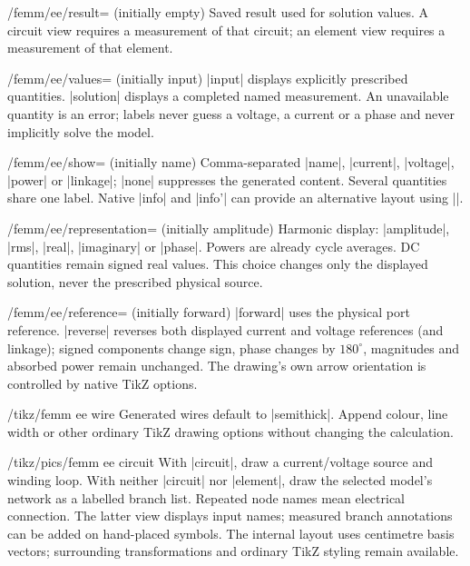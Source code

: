 \begin{key}{/femm/ee/result= (initially empty)}
Saved result used for solution values. A circuit view requires a measurement of
that circuit; an element view requires a measurement of that element.
\end{key}
\begin{key}{/femm/ee/values= (initially input)}
|input| displays explicitly prescribed quantities. |solution| displays a completed
named measurement. An unavailable quantity is an error; labels never guess a
voltage, a current or a phase and never implicitly solve the model.
\end{key}
\begin{key}{/femm/ee/show= (initially name)}
Comma-separated |name|, |current|, |voltage|, |power| or |linkage|; |none| suppresses
the generated content. Several quantities share one label. Native |info| and
|info'| can provide an alternative layout using |\femmvalue|.
\end{key}
\begin{key}{/femm/ee/representation= (initially amplitude)}
Harmonic display: |amplitude|, |rms|, |real|, |imaginary| or |phase|. Powers are
already cycle averages. DC quantities remain signed real values. This choice
changes only the displayed solution, never the prescribed physical source.
\end{key}
\begin{key}{/femm/ee/reference= (initially forward)}
|forward| uses the physical port reference. |reverse| reverses both displayed
current and voltage references (and linkage); signed components change sign,
phase changes by $180^\circ$, magnitudes and absorbed power remain unchanged.
The drawing's own arrow orientation is controlled by native TikZ options.
\end{key}
\begin{stylekey}{/tikz/femm ee wire}
Generated wires default to |semithick|. Append colour, line width or other ordinary
TikZ drawing options without changing the calculation.
\end{stylekey}
\begin{key}{/tikz/pics/femm ee circuit}
With |circuit|, draw a current/voltage source and winding loop. With neither
|circuit| nor |element|, draw the selected model's network as a labelled branch
list. Repeated node names mean electrical connection. The latter view displays
input names; measured branch annotations can be added on hand-placed symbols.
The internal layout uses centimetre basis vectors; surrounding transformations
and ordinary TikZ styling remain available.
\end{key}

